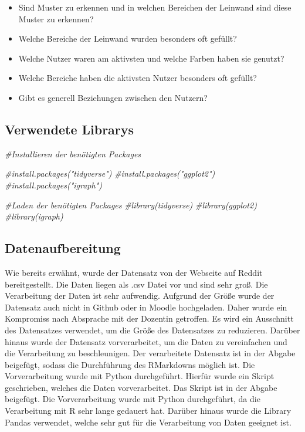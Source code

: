 \documentclass[
]{article}
\newenvironment{Shaded}{\begin{snugshade}}{\end{snugshade}}
\newcommand{\CommentTok}[1]{\textcolor[rgb]{0.56,0.35,0.01}{\textit{#1}}}
\providecommand{\tightlist}{%
  \setlength{\itemsep}{0pt}\setlength{\parskip}{0pt}}
\begin{document}
\begin{itemize}
\tightlist
\item
  Sind Muster zu erkennen und in welchen Bereichen der Leinwand sind
  diese Muster zu erkennen?
\item
  Welche Bereiche der Leinwand wurden besonders oft gefüllt?
\item
  Welche Nutzer waren am aktivsten und welche Farben haben sie genutzt?
\item
  Welche Bereiche haben die aktivsten Nutzer besonders oft gefüllt?
\item
  Gibt es generell Beziehungen zwischen den Nutzern?
\end{itemize}

\subsection{Verwendete Librarys}\label{verwendete-librarys}

\begin{Shaded}
\begin{Highlighting}[]
\CommentTok{\#Installieren der benötigten Packages}

\CommentTok{\#install.packages("tidyverse")}
\CommentTok{\#install.packages("ggplot2")}
\CommentTok{\#install.packages("igraph")}

\CommentTok{\#Laden der benötigten Packages}
\CommentTok{\#library(tidyverse)}
\CommentTok{\#library(ggplot2)}
\CommentTok{\#library(igraph)}
\end{Highlighting}
\end{Shaded}

\subsection{Datenaufbereitung}\label{datenaufbereitung}

Wie bereits erwähnt, wurde der Datensatz von der Webseite auf Reddit
bereitgestellt. Die Daten liegen als .csv Datei vor und sind sehr groß.
Die Verarbeitung der Daten ist sehr aufwendig. Aufgrund der Größe wurde
der Datensatz auch nicht in Github oder in Moodle hochgeladen. Daher
wurde ein Kompromiss nach Absprache mit der Dozentin getroffen. Es wird
ein Ausschnitt des Datensatzes verwendet, um die Größe des Datensatzes
zu reduzieren. Darüber hinaus wurde der Datensatz vorverarbeitet, um die
Daten zu vereinfachen und die Verarbeitung zu beschleunigen. Der
verarbeitete Datensatz ist in der Abgabe beigefügt, sodass die
Durchführung des RMarkdowns möglich ist. Die Vorverarbeitung wurde mit
Python durchgeführt. Hierfür wurde ein Skript geschrieben, welches die
Daten vorverarbeitet. Das Skript ist in der Abgabe beigefügt. Die
Vorverarbeitung wurde mit Python durchgeführt, da die Verarbeitung mit R
sehr lange gedauert hat. Darüber hinaus wurde die Library Pandas
verwendet, welche sehr gut für die Verarbeitung von Daten geeignet ist.
\end{document}

